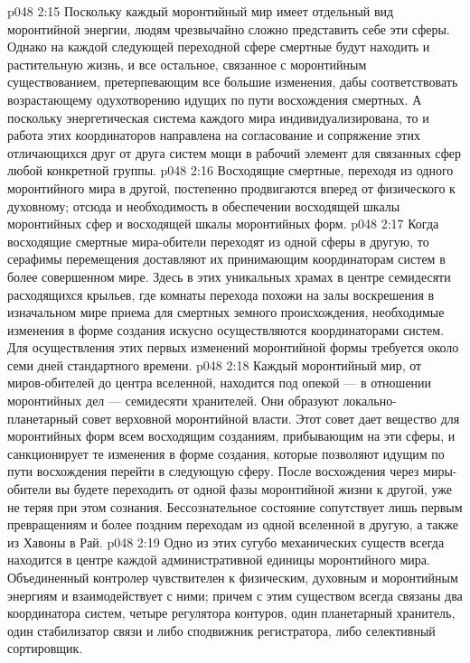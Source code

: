 \vs p048 2:15 \bibnobreakspace {} Поскольку каждый моронтийный мир имеет отдельный вид моронтийной энергии, людям чрезвычайно сложно представить себе эти сферы. Однако на каждой следующей переходной сфере смертные будут находить и растительную жизнь, и все остальное, связанное с моронтийным существованием, претерпевающим все большие изменения, дабы соответствовать возрастающему одухотворению идущих по пути восхождения смертных. А поскольку энергетическая система каждого мира индивидуализирована, то и работа этих координаторов направлена на согласование и сопряжение этих отличающихся друг от друга систем мощи в рабочий элемент для связанных сфер любой конкретной группы.
\vs p048 2:16 Восходящие смертные, переходя из одного моронтийного мира в другой, постепенно продвигаются вперед от физического к духовному; отсюда и необходимость в обеспечении восходящей шкалы моронтийных сфер и восходящей шкалы моронтийных форм.
\vs p048 2:17 Когда восходящие смертные мира\hyp{}обители переходят из одной сферы в другую, то серафимы перемещения доставляют их принимающим координаторам систем в более совершенном мире. Здесь в этих уникальных храмах в центре семидесяти расходящихся крыльев, где комнаты перехода похожи на залы воскрешения в изначальном мире приема для смертных земного происхождения, необходимые изменения в форме создания искусно осуществляются координаторами систем. Для осуществления этих первых изменений моронтийной формы требуется около семи дней стандартного времени.
\vs p048 2:18 \bibnobreakspace {} Каждый моронтийный мир, от миров\hyp{}обителей до центра вселенной, находится под опекой --- в отношении моронтийных дел --- семидесяти хранителей. Они образуют локально\hyp{}планетарный совет верховной моронтийной власти. Этот совет дает вещество для моронтийных форм всем восходящим созданиям, прибывающим на эти сферы, и санкционирует те изменения в форме создания, которые позволяют идущим по пути восхождения перейти в следующую сферу. После восхождения через миры\hyp{}обители вы будете переходить от одной фазы моронтийной жизни к другой, уже не теряя при этом сознания. Бессознательное состояние сопутствует лишь первым превращениям и более поздним переходам из одной вселенной в другую, а также из Хавоны в Рай.
\vs p048 2:19 \bibnobreakspace {} Одно из этих сугубо механических существ всегда находится в центре каждой административной единицы моронтийного мира. Объединенный контролер чувствителен к физическим, духовным и моронтийным энергиям и взаимодействует с ними; причем с этим существом всегда связаны два координатора систем, четыре регулятора контуров, один планетарный хранитель, один стабилизатор связи и либо сподвижник регистратора, либо селективный сортировщик.
